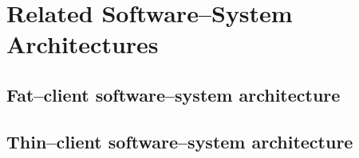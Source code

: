 \chapter{Related Software--System Architectures}


\section{Fat--client software--system architecture}


\section{Thin--client software--system architecture}

